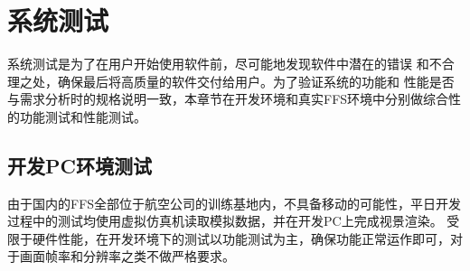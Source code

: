 \chapter{系统测试}
系统测试是为了在用户开始使用软件前，尽可能地发现软件中潜在的错误
和不合理之处，确保最后将高质量的软件交付给用户。为了验证系统的功能和
性能是否与需求分析时的规格说明一致，本章节在开发环境和真实FFS环境中分别做综合性的功能测试和性能测试。

\section{开发PC环境测试}
由于国内的FFS全部位于航空公司的训练基地内，不具备移动的可能性，平日开发过程中的测试均使用虚拟仿真机读取模拟数据，并在开发PC上完成视景渲染。
受限于硬件性能，在开发环境下的测试以功能测试为主，确保功能正常运作即可，对于画面帧率和分辨率之类不做严格要求。
